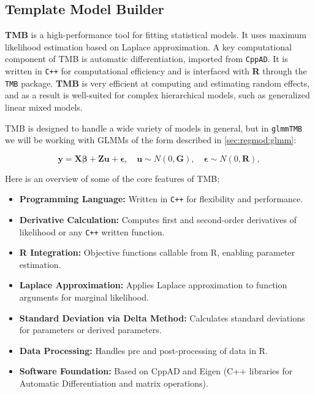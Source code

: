 \documentclass[12pt, twoside,hidelinks]{article}
\theoremstyle{definition}
\numberwithin{equation}{section}
\begin{document}
\subsection{Template Model Builder}\label{sec:rpack:TMB}

\textbf{TMB} is a high-performance tool for fitting statistical models. It uses maximum likelihood estimation based on Laplace approximation. A key computational component of TMB is automatic differentiation, imported from \texttt{CppAD}. It is written in \texttt{C++} for computational efficiency and is interfaced with \textbf{R} through the \texttt{TMB} package. \textbf{TMB} is very efficient at computing and estimating random effects, and as a result is well-suited for complex hierarchical models, such as generalized linear mixed models.
\newline

TMB is designed to handle a wide variety of models in general, but in \texttt{glmmTMB} we will be working with GLMMs of the form described in \ref{sec:regmod:glmm}:

\begin{equation}
    \boldsymbol{y} = \mathbf{X}\boldsymbol{\beta} + \mathbf{Z} \boldsymbol{u} + \boldsymbol{\epsilon}, \quad \boldsymbol{u} \sim N(0,\mathbf{G}), \quad \boldsymbol{\epsilon} \sim N(0, \mathbf{R}),
\label{eq:glmmtmb}
\end{equation}

Here is an overview of some of the core features of TMB;

\begin{itemize}
    \item \textbf{Programming Language:} Written in \texttt{C++} for flexibility and performance.
    \item \textbf{Derivative Calculation:} Computes first and second-order derivatives of likelihood or any \texttt{C++} written function.
    \item \textbf{R Integration:} Objective functions callable from R, enabling parameter estimation.
    \item \textbf{Laplace Approximation:} Applies Laplace approximation to function arguments for marginal likelihood.
    \item \textbf{Standard Deviation via Delta Method:} Calculates standard deviations for parameters or derived parameters.
    \item \textbf{Data Processing:} Handles pre and post-processing of data in R.
    \item \textbf{Software Foundation:} Based on CppAD and Eigen (C++ libraries for Automatic Differentiation and matrix operations).
\end{itemize}
\end{document}
